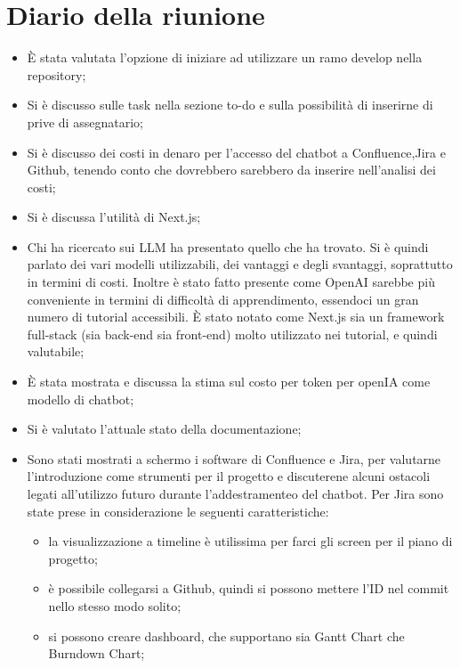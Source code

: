 
\section{Diario della riunione}

\begin{itemize}
    \item È stata valutata l'opzione di iniziare ad utilizzare un ramo develop nella repository;
    \item Si è discusso sulle task nella sezione to-do e sulla possibilità di inserirne di prive di assegnatario;
    \item Si è discusso dei costi in denaro per l'accesso del chatbot a Confluence,Jira e Github, tenendo conto che dovrebbero sarebbero da inserire nell'analisi dei costi;
    \item Si è discussa l'utilità di Next.js;
    \item Chi ha ricercato sui LLM ha presentato quello che ha trovato. Si è quindi parlato dei vari modelli utilizzabili, dei vantaggi e degli svantaggi, soprattutto in termini di costi. Inoltre è stato fatto presente come OpenAI sarebbe più conveniente in termini di difficoltà di apprendimento, essendoci un gran numero di tutorial accessibili. È stato notato come Next.js sia un framework full-stack (sia back-end sia front-end) molto utilizzato nei tutorial, e quindi valutabile;
    \item È stata mostrata e discussa la stima sul costo per token per openIA come modello di chatbot;
    \item Si è valutato l'attuale stato della documentazione;
    \item Sono stati mostrati a schermo i software di Confluence e Jira, per valutarne l'introduzione come strumenti per il progetto e discuterene alcuni ostacoli legati all'utilizzo futuro durante l'addestramenteo del chatbot.
    Per Jira sono state prese in considerazione le seguenti caratteristiche:
    \begin{itemize}
    \item la visualizzazione a timeline è utilissima per farci gli screen per il piano di progetto;
    \item è possibile collegarsi a Github, quindi si possono mettere l'ID nel commit nello stesso modo solito;
    \item si possono creare dashboard, che supportano sia Gantt Chart che Burndown Chart;

\end{itemize}
\end{itemize}
